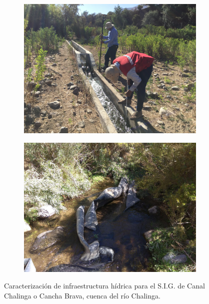 \documentclass[]{article}
\begin{document}
\begin{figure}[H]
  \centering
\begin{subfigure}{.45\textwidth}
\hfill
  \includegraphics[angle= 180, width=\textwidth]{Foto/ch1.jpg}
\end{subfigure}
\hfill
\begin{subfigure}{.45\textwidth}
\hfill
  \includegraphics[width=\textwidth]{Foto/ch2.jpg} 
\end{subfigure}
\caption{Caracterización de infraestructura hídrica para el S.I.G. de Canal Chalinga o Cancha Brava, cuenca del río Chalinga.}
\end{figure}
\end{document}
